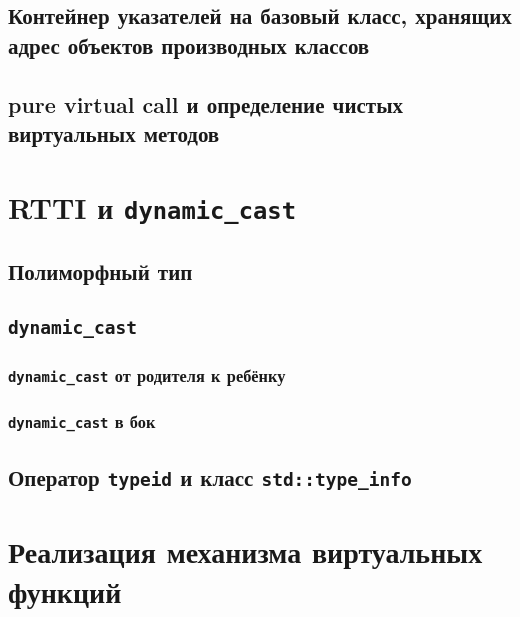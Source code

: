 \documentclass{article}
\begin{document}
\subsection*{Контейнер указателей на базовый класс, хранящих адрес объектов производных классов}
\subsection*{pure virtual call и определение чистых виртуальных методов}




\section*{RTTI и \texttt{dynamic\_cast}}
\subsection*{Полиморфный тип}
\subsection*{\texttt{dynamic\_cast}}

\subsubsection*{\texttt{dynamic\_cast} от родителя к ребёнку}
\subsubsection*{\texttt{dynamic\_cast} в бок}

\subsection*{Оператор \texttt{typeid} и класс \texttt{std::type\_info}}





\section*{Реализация механизма виртуальных функций}
\end{document}
